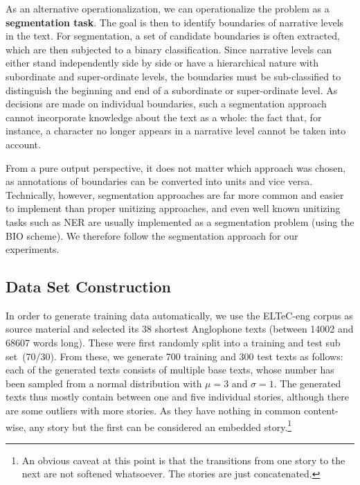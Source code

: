 \documentclass[10pt, a4paper]{article}
\newcommand{\sina}[1]{\textit{\textcolor{blue}{sina: #1}}}
\begin{document}
As an alternative operationalization, we can operationalize the problem as a \textbf{segmentation task}. The goal is then to identify boundaries of narrative levels in the text. For segmentation, a set of candidate boundaries is often extracted, which are then subjected to a binary classification. 
Since narrative levels can either stand independently side by side or have a hierarchical nature with subordinate and super-ordinate levels, the boundaries must be sub-classified to distinguish the beginning and end of a subordinate or super-ordinate level.
As decisions are made on individual boundaries, such a segmentation approach cannot incorporate knowledge about the text as a whole: the fact that, for instance, a character no longer appears in a narrative level cannot be taken into account.

From a pure output perspective, it does not matter which approach was chosen, as annotations of boundaries can be converted into units and vice versa. Technically, however, segmentation approaches are far more common and easier to implement than proper unitizing approaches, and even well known unitizing tasks such as NER are usually implemented as a segmentation problem (using the BIO scheme). We therefore follow the segmentation approach for our experiments.

\subsection{Data Set Construction}
\label{sec:data-set}


In order to generate training data automatically, we use the ELTeC-eng \cite{eltec} corpus as source material and selected its 38 shortest Anglophone texts (between \num{14002} and \num{68607} words long). These were first randomly split into a training and test sub set~(70/30). From these, we generate 700 training and 300 test texts as follows: each of the generated texts consists of multiple base texts, whose number has been sampled from a normal distribution with $\mu=3$ and $\sigma=1$. The generated texts thus mostly contain between one and five individual stories, although there are some outliers with more stories. As they have nothing in common content-wise, any story but the first can be considered an embedded story.\footnote{An obvious caveat at this point is that the transitions from one story to the next are not softened whatsoever. The stories are just concatenated.}
\end{document}
